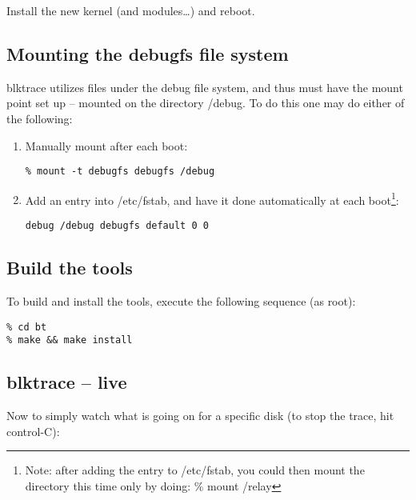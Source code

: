 \documentclass{article}
\begin{document}
Install the new kernel (and modules\ldots) and reboot. 

\subsection{\label{sec:mount}Mounting the debugfs file system}

blktrace utilizes files under the debug file system, and thus must have
the mount point set up -- mounted on the directory /debug. To do this
one may do either of the following:

\begin{enumerate}
  \item Manually mount after each boot:
\begin{verbatim}
% mount -t debugfs debugfs /debug
\end{verbatim}

  \item Add an entry into /etc/fstab, and have it done automatically at
  each boot\footnote{Note: after adding the entry to /etc/fstab, you
  could then mount the directory this time only by doing: \% mount /relay}:
\begin{verbatim}
debug /debug debugfs default 0 0
\end{verbatim}
\end{enumerate}

\subsection{\label{sec:build}Build the tools}

To build and install the tools, execute the following sequence (as root):

\begin{verbatim}
% cd bt
% make && make install
\end{verbatim}

\subsection{\label{sec:live-blktrace}blktrace -- live}

Now to simply watch what is going on for a specific disk (to stop the
trace, hit control-C):
\end{document}
